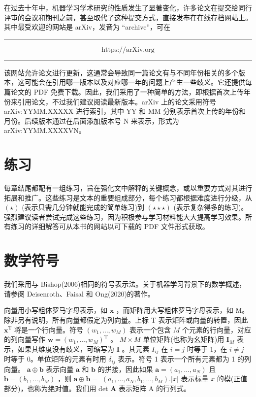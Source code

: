\documentclass[10pt]{report}
\newcommand{\HRule}{\begin{center}\rule{0.9\linewidth}{0.2mm}\end{center}}
\begin{document}
在过去十年中，机器学习学术研究的性质发生了显著变化，许多论文在提交给同行评审的会议和期刊之前，甚至取代了这种提交方式，直接发布在在线存档网站上。其中最受欢迎的网站是 arXiv，发音为 “archive”，可在

\HRule

\[
\text{ https://arXiv.org }
\]

\HRule

该网站允许论文进行更新，这通常会导致同一篇论文有与不同年份相关的多个版本，这可能会在引用哪一版本以及对应哪一年的问题上产生一些歧义。它还提供每篇论文的 PDF 免费下载。因此，我们采用了一种简单的方法，即根据首次上传年份来引用论文，不过我们建议阅读最新版本。arXiv 上的论文采用符号 arXiv:YYMM.XXXXX 进行索引，其中 YY 和 MM 分别表示首次上传的年份和月份。后续版本通过在后面添加版本号 \(\mathrm{N}\) 来表示，形式为 arXiv:YYMM.XXXXVN。

\section*{练习}

每章结尾都配有一组练习，旨在强化文中解释的关键概念，或以重要方式对其进行拓展和推广。这些练习是文本的重要组成部分，每个练习都根据难度进行分级，从 \(\left( \star \right)\) (表示只需几分钟就能完成的简单练习)到 \(\left( {\star  \star   \star  }\right)\) (表示复杂得多的练习)。强烈建议读者尝试完成这些练习，因为积极参与学习材料能大大提高学习效果。所有练习的详细解答可从本书的网站以可下载的 PDF 文件形式获取。

\section*{数学符号}

我们采用与 Bishop(2006)相同的符号表示法。关于机器学习背景下的数学概述，请参阅 Deisenroth、Faisal 和 Ong(2020)的著作。

向量用小写粗体罗马字母表示，如 \(\mathbf{x}\) ，而矩阵用大写粗体罗马字母表示，如 M。除非另有说明，所有向量都假定为列向量。上标 T 表示矩阵或向量的转置，因此 \({\mathbf{x}}^{\mathrm{T}}\) 将是一个行向量。符号 \(\left( {{w}_{1},\ldots ,{w}_{M}}\right)\) 表示一个包含 \(M\) 个元素的行向量，对应的列向量写作 \(\mathbf{w} = {\left( {w}_{1},\ldots ,{w}_{M}\right) }^{\mathrm{T}}\) 。 \(M \times  M\) 单位矩阵(也称为幺矩阵)用 \({\mathbf{I}}_{M}\) 表示，如果其维度没有歧义，可缩写为 \(\mathbf{I}\) 。其元素 \({I}_{ij}\) 在 \(i = j\) 时等于 1，在 \(i \neq  j\) 时等于 0。单位矩阵的元素有时用 \({\delta }_{ij}\) 表示。符号 1 表示一个所有元素都为 1 的列向量。 \(\mathbf{a} \oplus  \mathbf{b}\) 表示向量 \(\mathbf{a}\) 和 \(\mathbf{b}\) 的拼接，因此如果 \(\mathbf{a} = \left( {{a}_{1},\ldots ,{a}_{N}}\right)\) 且 \(\mathbf{b} = \left( {{b}_{1},\ldots ,{b}_{M}}\right)\) ，则 \(\mathbf{a} \oplus  \mathbf{b} =\)  \(\left( {{a}_{1},\ldots ,{a}_{N},{b}_{1},\ldots ,{b}_{M}}\right) .\left| x\right|\) 表示标量 \(x\) 的模(正值部分)，也称为绝对值。我们用 det \(\mathbf{A}\) 表示矩阵 A 的行列式。
\end{document}
